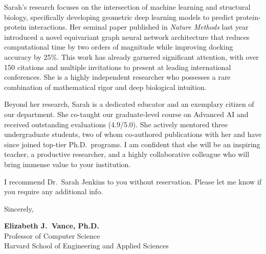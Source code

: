 \documentclass[11pt,letterpaper]{article}
\begin{document}
Sarah's research focuses on the intersection of machine learning and structural biology, specifically developing geometric deep learning models to predict protein-protein interactions. Her seminal paper published in \textit{Nature Methods} last year introduced a novel equivariant graph neural network architecture that reduces computational time by two orders of magnitude while improving docking accuracy by 25\%. This work has already garnered significant attention, with over 150 citations and multiple invitations to present at leading international conferences. She is a highly independent researcher who possesses a rare combination of mathematical rigor and deep biological intuition.

Beyond her research, Sarah is a dedicated educator and an exemplary citizen of our department. She co-taught our graduate-level course on Advanced AI and received outstanding evaluations (4.9/5.0). She actively mentored three undergraduate students, two of whom co-authored publications with her and have since joined top-tier Ph.D.\ programs. I am confident that she will be an inspiring teacher, a productive researcher, and a highly collaborative colleague who will bring immense value to your institution.

I recommend Dr.\ Sarah Jenkins to you without reservation. Please let me know if you require any additional info.

\vspace{1.0em}

\noindent
Sincerely,

\vspace{2.0em}

\noindent
\textbf{Elizabeth J.\ Vance, Ph.D.}\\
Professor of Computer Science\\
Harvard School of Engineering and Applied Sciences
\end{document}

